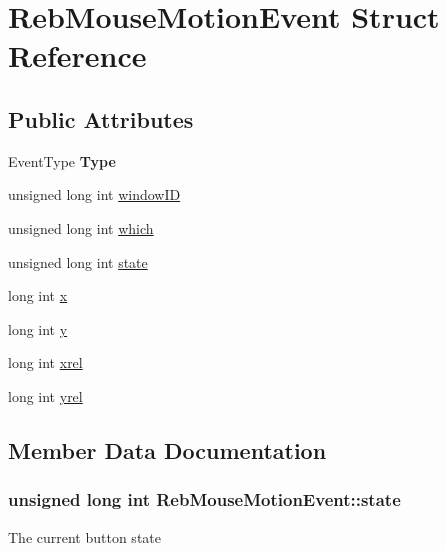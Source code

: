 \hypertarget{struct_reb_mouse_motion_event}{}\section{Reb\+Mouse\+Motion\+Event Struct Reference}
\label{struct_reb_mouse_motion_event}
\subsection*{Public Attributes}
\begin{DoxyCompactItemize}
\item 
Event\+Type {\bfseries Type}\hypertarget{struct_reb_mouse_motion_event_ad961ba882412d191e9d05bc74e66694f}{}\label{struct_reb_mouse_motion_event_ad961ba882412d191e9d05bc74e66694f}

\item 
unsigned long int \hyperlink{struct_reb_mouse_motion_event_a3d59b67b8f82a0a68a461c671350116c}{window\+ID}
\item 
unsigned long int \hyperlink{struct_reb_mouse_motion_event_a360617a3a516627fee7f0eccdaf9a3b2}{which}
\item 
unsigned long int \hyperlink{struct_reb_mouse_motion_event_af4c7172ab68f2ff471d7601c0c3f1363}{state}
\item 
long int \hyperlink{struct_reb_mouse_motion_event_a42e7e532f6f42157cc18c05ea401ed29}{x}
\item 
long int \hyperlink{struct_reb_mouse_motion_event_afae2d64ddb620d96f6e563661f3907c9}{y}
\item 
long int \hyperlink{struct_reb_mouse_motion_event_a82f4063d5de6d4be3c9e3fd4c04e6bab}{xrel}
\item 
long int \hyperlink{struct_reb_mouse_motion_event_a9609f16fdc4e801bc3d0d7e6c5fa9843}{yrel}
\end{DoxyCompactItemize}


\subsection{Member Data Documentation}
\subsubsection[{\texorpdfstring{state}{state}}]{\setlength{\rightskip}{0pt plus 5cm}unsigned long int Reb\+Mouse\+Motion\+Event\+::state}\hypertarget{struct_reb_mouse_motion_event_af4c7172ab68f2ff471d7601c0c3f1363}{}\label{struct_reb_mouse_motion_event_af4c7172ab68f2ff471d7601c0c3f1363}
The current button state 
